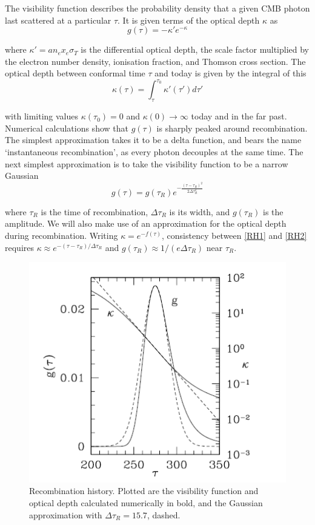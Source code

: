 \documentclass[a4paper,10pt]{article}
\begin{document}
The visibility function describes the probability density that a given CMB photon last scattered at a particular $\tau$. It is given terms of the optical depth $\kappa$ as
\begin{equation}
g(\tau) = -\kappa'e^{-\kappa}
\label{RH1}
\end{equation}

where $\kappa' = an_ex_e\sigma_T$ is the differential optical depth, the scale factor multiplied by the electron number density, ionisation fraction, and Thomson cross section. The optical depth between conformal time $\tau$ and today is given by the integral of this 
\begin{equation}
\kappa(\tau) = \int_\tau^{\tau_0} \kappa'(\tau')d\tau'
\end{equation}

with limiting values $\kappa(\tau_0) = 0$ and $\kappa(0)\rightarrow \infty$ today and in the far past. Numerical calculations show that $g(\tau)$ is sharply peaked around recombination. The simplest approximation takes it to be a delta function, and bears the name `instantaneous recombination', as every photon decouples at the same time. The next simplest approximation is to take the visibility function to be a narrow Gaussian
\begin{equation}
g(\tau) = g(\tau_R)e^{-\frac{(\tau-\tau_R)^2}{2\Delta\tau_R^2}}
\label{RH2}
\end{equation}

where $\tau_R$ is the time of recombination, $\Delta\tau_R$ is its width, and $g(\tau_R)$ is the amplitude. We will also make use of an approximation for the optical depth during recombination. Writing $\kappa = e^{-f(\tau)}$, consistency between \ref{RH1} and \ref{RH2} requires $\kappa \approx e^{-(\tau-\tau_R) / \Delta\tau_R}$ and $g(\tau_R)\approx 1/(e\Delta\tau_R)$ near $\tau_R$. 

\begin{figure}[h]
  \includegraphics[width=0.5\linewidth]{recombinationhistory.png}
  \centering
  \caption{Recombination history. Plotted are the visibility function and optical depth calculated numerically in bold, and the Gaussian approximation with $\Delta\tau_R=15.7$, dashed. }
\end{figure}
\end{document}
